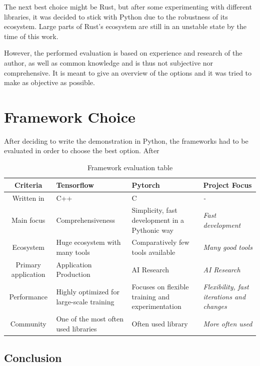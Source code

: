 \documentclass[12pt, a4paper, titlepage]{report}
\begin{document}
The next best choice might be Rust, but after some experimenting with different libraries, it was decided to stick with Python due to the robustness of its ecosystem. Large parts of Rust's ecosystem are still in an unstable state by the time of this work.

However, the performed evaluation is based on experience and research of the author, as well as common knowledge and is thus not subjective nor comprehensive. It is meant to give an overview of the options and it was tried to make as objective as possible.



\section{Framework Choice}

After deciding to write the demonstration in Python, the frameworks had to be evaluated in order to choose the best option. After 

\begin{table}
   \begin{tabular} {|c||p{4.0cm}|p{4.0cm}||p{3.0cm}|}
      \hline
      \textbf{Criteria}          & \textbf{Tensorflow} & \textbf{Pytorch} & \textbf{Project Focus} \\
      \hline
      Written in           & C++ & C & \emph{-} \\ \hline
      Main focus           & Comprehensiveness & Simplicity, fast development in a Pythonic way & \emph{Fast development} \\ \hline
      Ecosystem            & Huge ecosystem with many tools & Comparatively few tools available & \emph{Many good tools} \\ \hline
      Primary application  & Application Production & AI Research & \emph{AI Research} \\ \hline
      Performance          & Highly optimized for large-scale training & Focuses on flexible training and experimentation & \emph{Flexibility, fast iterations and changes} \\ \hline
      Community            & One of the most often used libraries & Often used library & \emph{More often used} \\ \hline
      \hline
   \end{tabular}
   \caption{Framework evaluation table}
   \label{table:framework_evaluation}
\end{table}

\subsection{Conclusion}
\end{document}
